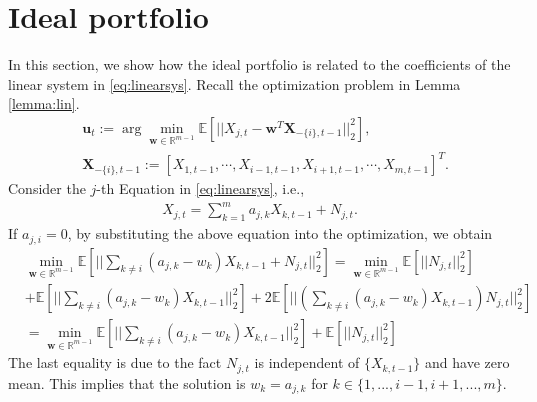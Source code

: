 \section{Ideal portfolio}
In this section, we show how the ideal portfolio is related to the coefficients of the linear system in \eqref{eq:linearsys}.  
Recall the optimization problem in Lemma \ref{lemma:lin}. 
\begin{align*}
&\textbf{u}_t:=\arg\min_{\textbf{w}\in\mathbb{R}^{m-1}}\mathbb{E}\left[||X_{j,t}- \textbf{w}^T \textbf{X}_{-\{i\},t-1}||_2^2\right],\\
&\textbf{X}_{-\{i\},t-1} :=[X_{1,t-1},\cdots, X_{i-1,t-1}, X_{i+1,t-1}, \cdots, X_{m,t-1} ]^T.
\end{align*}
Consider the $j$-th Equation in \eqref{eq:linearsys}, i.e., 
\begin{align*}
    X_{j,t}=\sum_{k=1}^m a_{j,k}X_{k,t-1}+N_{j,t}.
\end{align*}
If $a_{j,i}=0$, by substituting the above equation into the optimization, we obtain
\begin{align*}
&\min_{\textbf{w}\in\mathbb{R}^{m-1}}\mathbb{E}\left[||\sum_{k\neq i} (a_{j,k}-w_{k})X_{k,t-1}+N_{j,t}||_2^2\right]=\min_{\textbf{w}\in\mathbb{R}^{m-1}}\mathbb{E}\left[||N_{j,t}||_2^2\right]\\
&+\mathbb{E}\left[||\sum_{k\neq i} (a_{j,k}-w_{k})X_{k,t-1}||_2^2\right]+2\mathbb{E}\left[||\left(\sum_{k\neq i} (a_{j,k}-w_{k})X_{k,t-1}\right)N_{j,t}||_2^2\right]\\
&=\min_{\textbf{w}\in\mathbb{R}^{m-1}}\mathbb{E}\left[||\sum_{k\neq i} (a_{j,k}-w_{k})X_{k,t-1}||_2^2\right]+\mathbb{E}\left[||N_{j,t}||_2^2\right]
\end{align*}
The last equality is due to the fact $N_{j,t}$ is independent of $\{X_{k,t-1}\}$ and have zero mean. This implies that the solution is $w_k=a_{j,k}$ for $k\in\{1,...,i-1,i+1,...,m\}$.











